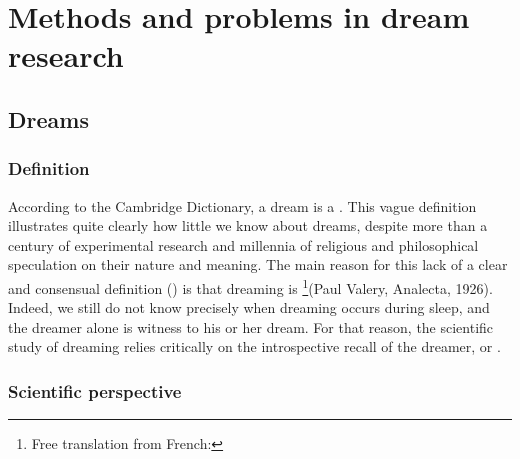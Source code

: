 \cleardoublepage

\chapter{Methods and problems in dream research}
\label{sec:dream-research}


\section{Dreams}
\label{sec:dream-research:dreams}

\subsection{Definition}
\label{sec:dream-research:dreams:definition}

According to the Cambridge Dictionary, a dream is a . This vague definition illustrates quite clearly how little we know about dreams, despite more than a century of experimental research and millennia of religious and philosophical speculation on their nature and meaning. The main reason for this lack of a clear and consensual definition (\cite{pagel_definitions_2001}) is that dreaming is  \footnote{Free translation from French: }(Paul Valery, Analecta, 1926).  Indeed, we still do not know precisely when dreaming occurs during sleep, and the dreamer alone is witness to his or her dream. For that reason, the scientific study of dreaming relies critically on the introspective recall of the dreamer, or  \citep{schwartz_dreaming:_2005}.

\subsection{Scientific perspective}
\label{sec:dream-research:dreams:science}

